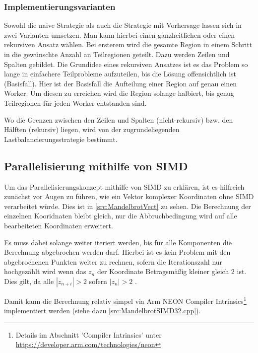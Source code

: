 \subsubsection{Implementierungsvarianten}

Sowohl die naive Strategie als auch die Strategie mit Vorhersage lassen sich in zwei Varianten umsetzen.
Man kann hierbei einen ganzheitlichen oder einen rekursiven Ansatz wählen.
Bei ersterem wird die gesamte Region in einem Schritt in die gewünschte Anzahl an Teilregionen geteilt.
Dazu werden Zeilen und Spalten gebildet.
Die Grundidee eines rekursiven Ansatzes ist es das Problem so lange in einfachere Teilprobleme aufzuteilen, bis die Lösung offensichtlich ist (Basisfall).
Hier ist der Basisfall die Aufteilung einer Region auf genau einen Worker.
Um diesen zu erreichen wird die Region solange halbiert, bis genug Teilregionen für jeden Worker entstanden sind.

Wo die Grenzen zwischen den Zeilen und Spalten (nicht-rekursiv) bzw. den Hälften (rekursiv) liegen, wird von der zugrundeliegenden Lastbalancierungsstrategie bestimmt.





\subsection{Parallelisierung mithilfe von SIMD}

Um das Parallelisierungskonzept mithilfe von SIMD zu erklären,
ist es hilfreich zunächst vor Augen zu führen, wie ein Vektor komplexer Koordinaten ohne SIMD verarbeitet würde.
Dies ist in \autoref{src:MandelbrotVect} zu sehen.
Die Berechnung der einzelnen Kooridnaten bleibt gleich, nur die Abbruchbedingung wird auf alle bearbeiteten Koordinaten erweitert.

Es muss dabei solange weiter iteriert werden, bis für alle Komponenten die Berechnung abgebrochen werden darf.
Hierbei ist es kein Problem mit den abgebrochenen Punkten weiter zu rechnen, sofern die
Iterationszahl nur hochgezählt wird wenn das $z_n$ der Koordinate Betragsmäßig kleiner gleich $2$ ist.
Dies gilt, da alle $|z_{n+i}| > 2$ sofern $|z_n| > 2$ \cite{424331}.

\begin{figure}[h!]
	
\end{figure}

Damit kann die Berechnung relativ simpel via Arm NEON Compiler Intrinsics\footnote{Details im Abschnitt 'Compiler Intrinsics' unter \url{https://developer.arm.com/technologies/neon}} implementiert werden (siehe dazu \autoref{src:MandelbrotSIMD32.cpp}).

